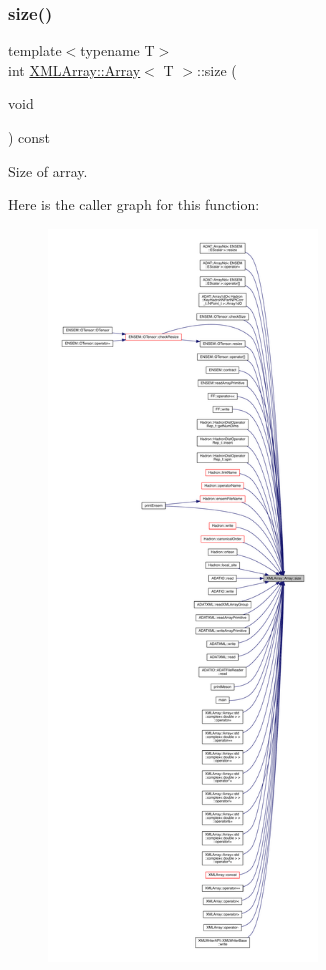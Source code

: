 \subsubsection{\texorpdfstring{size()}{size()}\hspace{0.1cm}{\footnotesize\ttfamily [2/3]}}
{\footnotesize\ttfamily template$<$typename T$>$ \\
int \mbox{\hyperlink{classXMLArray_1_1Array}{X\+M\+L\+Array\+::\+Array}}$<$ T $>$\+::size (\begin{DoxyParamCaption}\item[{void}]{ }\end{DoxyParamCaption}) const\hspace{0.3cm}{\ttfamily [inline]}}



Size of array. 

Here is the caller graph for this function\+:
\nopagebreak
\begin{figure}[H]
\begin{center}
\leavevmode
\includegraphics[height=550pt]{db/d6c/classXMLArray_1_1Array_ab59904c2aa0e31c18c6cd5f5a186e292_icgraph}
\end{center}
\end{figure}
\mbox{\label{classXMLArray_1_1Array_ab59904c2aa0e31c18c6cd5f5a186e292}} 
